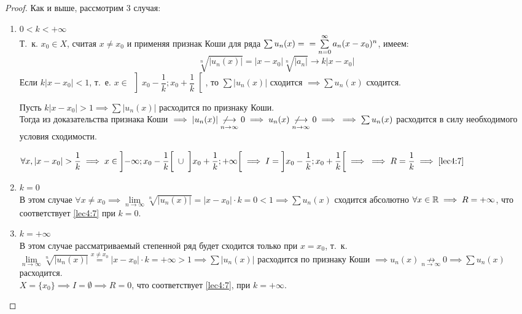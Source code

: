 \documentclass[../../main.tex]{subfiles}
\begin{document}
\begin{proof}
	Как и выше, рассмотрим 3 случая:
	\begin{enumerate}
		\item $0 < k < +\infty$ \\
		Т.~к. $x_0 \in X$, считая $x \ne x_0$ и применяя признак Коши
		для ряда $\sum u_n(x) = \\ = \sum\limits_{n = 0}^{\infty} 
		a_n(x - x_0)^n$, имеем:
		\[ \sqrt[n]{ |u_n(x)| } = |x - x_0| \sqrt[n]{|a_n|} 
		\longrightarrow k|x - x_0|
		  \]
		 Если $k|x - x_0| < 1$, т.~е. 
		 $x \in \: \left] x_0 - \dfrac{1}{k}; x_0 + \dfrac{1}{k} \right[$, то
		 $\sum |u_n(x)| $ сходится $\implies \sum u_n(x)$ сходится.
		 
		 Пусть $k|x - x_0| > 1 \implies \sum |u_n(x)|$ расходится
		 по признаку Коши. \\
		 Тогда из доказательства признака Коши $\implies |u_n(x)| 
		 \underset{n \to \infty}{\not \longrightarrow} 0 \implies u_n(x)
		 \underset{n \to \infty}{\not \longrightarrow} 0 \implies 
		 \\ \implies \sum u_n(x) $
		 расходится в силу необходимого условия сходимости.
		 
		 $\forall x, |x - x_0| > \dfrac{1}{k} \implies 
		 x \in \left]-\infty; x_0 - \dfrac{1}{k} \right[ \;
		 \cup \; \left] x_0 + \dfrac{1}{k}; +\infty\right[ 
		 \implies I = \left]x_0 - \dfrac{1}{k}; x_0 + \dfrac{1}{k} \right[ 
		 \implies \\ \implies R = \dfrac{1}{k} \implies \eqref{lec4:7}$
		 
		 \item $k = 0$ \\
		 В этом случае $\forall x \ne x_0 \implies 
		 \underset{n \to \infty}{\lim} \sqrt[n]{|u_n(x)|} =
		 |x - x_0| \cdot k = 0 < 1 \implies \sum u_n(x)$ 
		 сходится абсолютно 
		 $\forall x \in \mathbb{R} \implies R = +\infty$, что соответствует 
		 \eqref{lec4:7} при $k = 0$.
		 
		 \item $k = +\infty$ \\
		 В этом случае рассматриваемый степенной ряд будет сходится
		 только при $x = x_0$, т.~к. $\underset{n \to \infty}{\lim}
		 \sqrt[n]{|u_n(x)|} \overset{x \ne x_0} = |x - x_0| \cdot k =
		 +\infty > 1 \implies \sum |u_n(x)| $ расходится по 
		 признаку Коши
		 $\implies u_n(x) \underset{n \to \infty}{\not \longrightarrow} 0 
		 \implies \sum u_n(x)$ расходится. \\
		 $X = \{ x_0 \} \implies I = \emptyset \implies R = 0$,
		 что соответствует \eqref{lec4:7}, при $k = +\infty$.
	\end{enumerate}
\end{proof}
\end{document}
